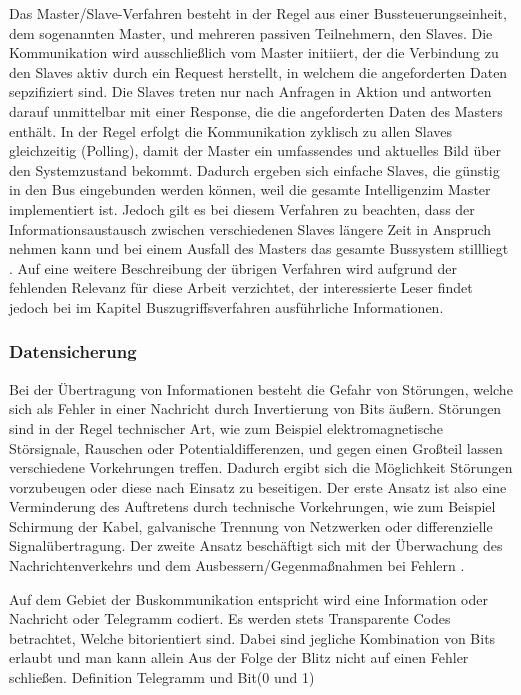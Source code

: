 Das Master/Slave-Verfahren besteht in der Regel aus einer Bussteuerungseinheit, dem sogenannten Master, und mehreren passiven Teilnehmern, den Slaves. Die Kommunikation wird ausschließlich vom Master initiiert, der die Verbindung zu den Slaves aktiv durch ein Request herstellt, in welchem die angeforderten Daten sepzifiziert sind. Die Slaves treten nur nach Anfragen in Aktion und antworten darauf unmittelbar mit einer Response, die die angeforderten Daten des Masters enthält. In der Regel erfolgt die Kommunikation zyklisch zu allen Slaves gleichzeitig (Polling), damit der Master ein umfassendes und aktuelles Bild über den Systemzustand bekommt. Dadurch ergeben sich einfache Slaves, die günstig in den Bus eingebunden werden können, weil die gesamte \Gun Intelligenz\Gob im Master implementiert ist. Jedoch gilt es bei diesem Verfahren zu beachten, dass der Informationsaustausch zwischen verschiedenen Slaves längere Zeit in Anspruch nehmen kann und bei einem Ausfall des Masters das gesamte Bussystem stillliegt \cite[S.~19ff.]{schn06}.
Auf eine weitere Beschreibung der übrigen Verfahren wird aufgrund der fehlenden Relevanz für diese Arbeit verzichtet, der interessierte Leser findet jedoch bei \cite{schn06} im Kapitel Buszugriffsverfahren ausführliche Informationen.

\subsubsection{Datensicherung}

Bei der Übertragung von Informationen besteht die Gefahr von Störungen, welche sich als Fehler in einer Nachricht durch Invertierung von Bits  äußern. Störungen sind in der Regel technischer Art, wie zum Beispiel elektromagnetische Störsignale, Rauschen oder Potentialdifferenzen, und gegen einen Großteil lassen verschiedene Vorkehrungen treffen. Dadurch ergibt sich die Möglichkeit Störungen vorzubeugen oder diese nach Einsatz zu beseitigen. Der erste Ansatz ist also eine Verminderung des Auftretens durch technische Vorkehrungen, wie zum Beispiel Schirmung der Kabel, galvanische Trennung von Netzwerken oder differenzielle Signalübertragung. Der zweite Ansatz beschäftigt sich mit der Überwachung des Nachrichtenverkehrs und dem Ausbessern/Gegenmaßnahmen bei Fehlern \cite[S.~30]{schn06}.

Auf dem Gebiet der Buskommunikation entspricht wird eine Information oder Nachricht oder Telegramm codiert. Es werden stets Transparente Codes betrachtet, Welche bitorientiert sind. Dabei sind jegliche Kombination von Bits erlaubt und man kann allein Aus der Folge der Blitz nicht auf einen Fehler schließen.
Definition Telegramm und Bit(0 und 1)

